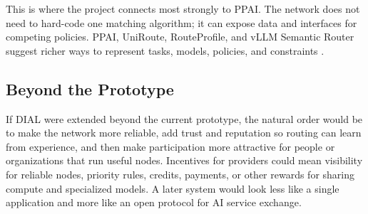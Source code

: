 This is where the project connects most strongly to PPAI. The network does not
need to hard-code one matching algorithm; it can expose data and interfaces
for competing policies. PPAI, UniRoute, RouteProfile, and vLLM Semantic Router
suggest richer ways to represent tasks, models, policies, and constraints
\citep{wang2026ppai,jitkrittum2025uniroute,xu2026routeprofile,vllmsemanticrouter2026}.

\subsection{Beyond the Prototype}

If DIAL were extended beyond the current prototype, the natural order would be
to make the network more reliable, add trust and reputation so routing can
learn from experience, and then make participation more attractive for people
or organizations that run useful nodes. Incentives for providers could mean
visibility for reliable nodes, priority rules, credits, payments, or other
rewards for sharing compute and specialized models. A later system would look
less like a single application and more like an open protocol for AI service
exchange.
